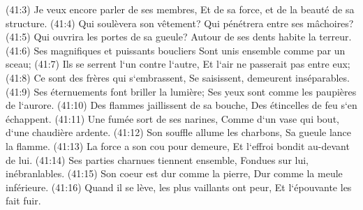 \verse (41:3) Je veux encore parler de ses membres, Et de sa force, et de la beauté de sa structure. 
\verse (41:4) Qui soulèvera son vêtement? Qui pénétrera entre ses mâchoires? 
\verse (41:5) Qui ouvrira les portes de sa gueule? Autour de ses dents habite la terreur. 
\verse (41:6) Ses magnifiques et puissants boucliers Sont unis ensemble comme par un sceau; 
\verse (41:7) Ils se serrent l`un contre l`autre, Et l`air ne passerait pas entre eux; 
\verse (41:8) Ce sont des frères qui s`embrassent, Se saisissent, demeurent inséparables. 
\verse (41:9) Ses éternuements font briller la lumière; Ses yeux sont comme les paupières de l`aurore. 
\verse (41:10) Des flammes jaillissent de sa bouche, Des étincelles de feu s`en échappent. 
\verse (41:11) Une fumée sort de ses narines, Comme d`un vase qui bout, d`une chaudière ardente. 
\verse (41:12) Son souffle allume les charbons, Sa gueule lance la flamme. 
\verse (41:13) La force a son cou pour demeure, Et l`effroi bondit au-devant de lui. 
\verse (41:14) Ses parties charnues tiennent ensemble, Fondues sur lui, inébranlables. 
\verse (41:15) Son coeur est dur comme la pierre, Dur comme la meule inférieure. 
\verse (41:16) Quand il se lève, les plus vaillants ont peur, Et l`épouvante les fait fuir. 
